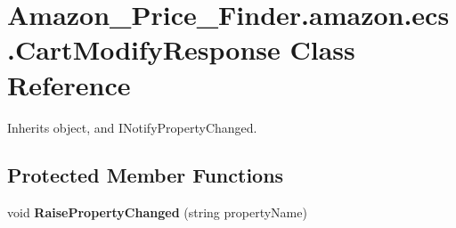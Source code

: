 \hypertarget{class_amazon___price___finder_1_1amazon_1_1ecs_1_1_cart_modify_response}{\section{Amazon\-\_\-\-Price\-\_\-\-Finder.\-amazon.\-ecs.\-Cart\-Modify\-Response Class Reference}
\label{class_amazon___price___finder_1_1amazon_1_1ecs_1_1_cart_modify_response}
}


 




Inherits object, and I\-Notify\-Property\-Changed.

\subsection*{Protected Member Functions}
\begin{DoxyCompactItemize}
\item 
\hypertarget{class_amazon___price___finder_1_1amazon_1_1ecs_1_1_cart_modify_response_a33b67141e6dd9cbf4774bf44b16af17b}{void {\bfseries Raise\-Property\-Changed} (string property\-Name)}\label{class_amazon___price___finder_1_1amazon_1_1ecs_1_1_cart_modify_response_a33b67141e6dd9cbf4774bf44b16af17b}

\end{DoxyCompactItemize}
